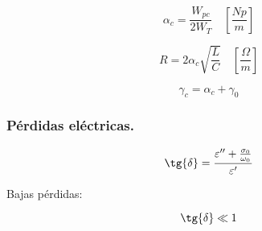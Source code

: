 \documentclass[12pt,a4paper]{article}
\begin{document}
\[ \alpha_c = \frac{W_{pc}}{2 W_T} \quad \left[ \frac{Np}{m} \right] \]

\[ R = 2 \alpha_c \sqrt{\frac{L}{C}} \quad \left[ \frac{\Omega}{m} \right] \]

\[ \gamma_c = \alpha_c + \gamma_0 \]

\subsubsection{Pérdidas eléctricas.}
\label{ssub:perdidas_electricas}

\[ \tg{\delta} = \frac{\varepsilon^{\prime\prime} + \frac{\sigma_0}{\omega_0}}{\varepsilon^{\prime}} \]

Bajas pérdidas:

\[ \tg{\delta} \ll 1 \]
\end{document}
